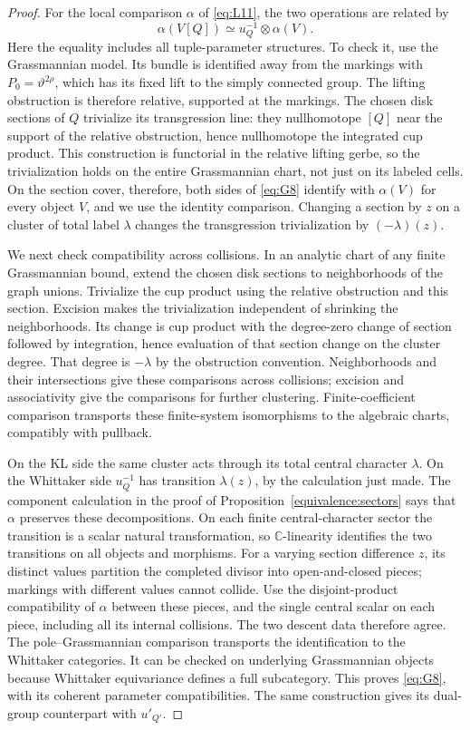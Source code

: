 \documentclass[11pt]{article}
\numberwithin{equation}{section}
\theoremstyle{definition}
\theoremstyle{remark}
\begin{document}
\begin{proof}
For the local comparison \(\alpha\) of \eqref{eq:L11}, the two
operations are related by
\begin{equation}\label{eq:G8}
 \alpha(V[Q])\simeq u_Q^{-1}\otimes\alpha(V).
\end{equation}
Here the equality includes all tuple-parameter structures.  To check
it, use the Grassmannian model.  Its bundle is identified away from
the markings with \(P_0=\vartheta^{2\rho}\), which has its fixed
lift to the simply connected group.  The lifting obstruction is
therefore relative, supported at the markings.  The chosen disk
sections of \(Q\) trivialize its transgression line: they nullhomotope
\([Q]\) near the support of the relative obstruction, hence nullhomotope
the integrated cup product.  This construction is functorial in the
relative lifting gerbe, so the trivialization holds on the entire
Grassmannian chart, not just on its labeled cells.  On the section
cover, therefore, both sides of \eqref{eq:G8} identify with
\(\alpha(V)\) for every object \(V\), and we use the identity
comparison.  Changing a section by \(z\) on a cluster of total label
\(\lambda\) changes the transgression trivialization by
\((-\lambda)(z)\).

We next check compatibility across collisions.  In an analytic chart of any finite
Grassmannian bound, extend the chosen disk sections to neighborhoods
of the graph unions.  Trivialize the cup product using the relative
obstruction and this section.  Excision makes the trivialization
independent of shrinking the neighborhoods.  Its change is cup
product with the degree-zero change of section followed by
integration, hence evaluation of that section change on the cluster
degree.  That degree is \(-\lambda\) by the obstruction convention.
Neighborhoods and their intersections give these comparisons across
collisions; excision and associativity give the comparisons for
further clustering.  Finite-coefficient comparison transports these
finite-system isomorphisms to the algebraic charts, compatibly with
pullback.

On the KL side the same cluster acts through its total central
character \(\lambda\).  On the Whittaker side \(u_Q^{-1}\) has
transition \(\lambda(z)\), by the calculation just made.  The
component calculation in the proof of
Proposition~\ref{equivalence:sectors} says that \(\alpha\) preserves
these decompositions.  On each finite central-character sector the
transition is a scalar natural transformation, so \(\mathbb C\)-linearity
identifies the two transitions on all objects and morphisms.
For a varying section difference \(z\), its distinct values partition
the completed divisor into open-and-closed pieces; markings with
different values cannot collide.  Use the disjoint-product compatibility
of \(\alpha\) between these pieces, and the single central scalar
on each piece, including all its internal collisions.
The two descent data therefore agree.  The pole--Grassmannian comparison transports the
identification to the Whittaker categories.  It can be checked on
underlying Grassmannian objects because Whittaker equivariance
defines a full subcategory.  This proves \eqref{eq:G8}, with its
coherent parameter compatibilities.  The same construction gives
its dual-group counterpart with \(u'_{Q'}\).


\end{proof}
\end{document}
